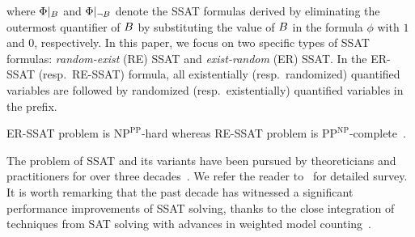 where $ \Phi|_{B} $ and $ \Phi|_{\neg B} $ denote the SSAT formulas derived by eliminating the outermost quantifier of $ B $  by substituting the value of $ B $ in the formula $ \phi $ with $ 1 $ and $ 0 $, respectively. In this paper, we focus on two specific types of SSAT formulas:  \textit{random-exist} (RE) SSAT and \textit{exist-random} (ER) SSAT. In the ER-SSAT (resp.\ RE-SSAT) formula, all existentially (resp.\ randomized) quantified variables are followed by randomized (resp.\ existentially) quantified variables in the prefix.


\begin{remark}
	ER-SSAT problem is $\mathrm{NP}^{\mathrm{PP}}$-hard whereas RE-SSAT problem is $\mathrm{PP}^{\mathrm{NP}}$-complete~\cite{littman2001stochastic}.
\end{remark}



The problem of SSAT and its variants have been pursued by theoreticians and practitioners for over three decades~\cite{majercik2005dc,fremont2017maximum,huang2006combining}. We refer the reader to~\cite{lee2017solving,lee2018solving} for detailed survey. It is worth remarking that the past decade has witnessed a significant performance improvements of SSAT solving, thanks to the close integration of techniques from SAT solving with advances in weighted model counting~\cite{sang2004combining,chakraborty2013scalable,chakraborty2014distribution}. 



\noindent\makebox[\linewidth]{\rule{\paperwidth}{2.5pt}}






